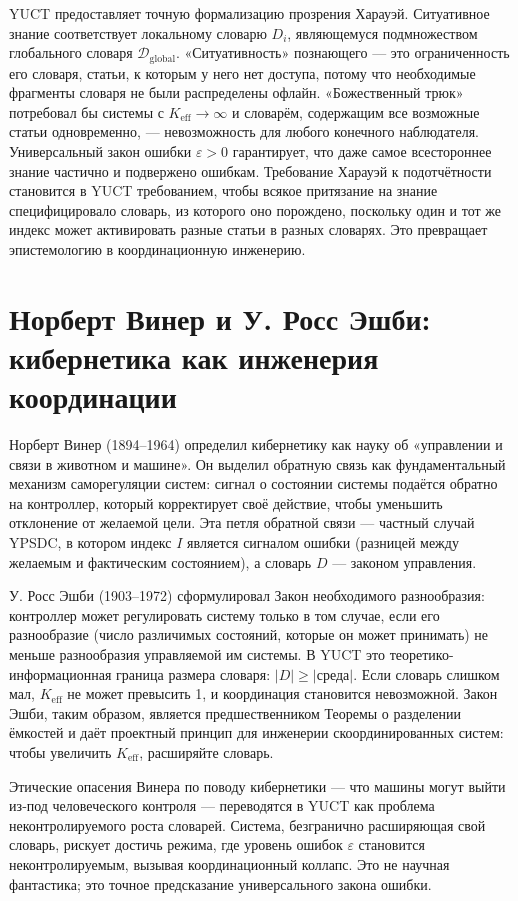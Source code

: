 \documentclass[12pt,a4paper]{article}
\begin{document}
	YUCT предоставляет точную формализацию прозрения Харауэй. Ситуативное знание соответствует локальному словарю \(D_i\), являющемуся подмножеством глобального словаря \(\mathcal{D}_{\text{global}}\). «Ситуативность» познающего — это ограниченность его словаря, статьи, к которым у него нет доступа, потому что необходимые фрагменты словаря не были распределены офлайн. «Божественный трюк» потребовал бы системы с \(K_{\mathrm{eff}} \to \infty\) и словарём, содержащим все возможные статьи одновременно, — невозможность для любого конечного наблюдателя. Универсальный закон ошибки \(\varepsilon > 0\) гарантирует, что даже самое всестороннее знание частично и подвержено ошибкам. Требование Харауэй к подотчётности становится в YUCT требованием, чтобы всякое притязание на знание специфицировало словарь, из которого оно порождено, поскольку один и тот же индекс может активировать разные статьи в разных словарях. Это превращает эпистемологию в координационную инженерию.
	
	\section{Норберт Винер и У. Росс Эшби: кибернетика как инженерия координации}
	
	Норберт Винер (1894–1964) определил кибернетику как науку об «управлении и связи в животном и машине». Он выделил обратную связь как фундаментальный механизм саморегуляции систем: сигнал о состоянии системы подаётся обратно на контроллер, который корректирует своё действие, чтобы уменьшить отклонение от желаемой цели. Эта петля обратной связи — частный случай YPSDC, в котором индекс \(I\) является сигналом ошибки (разницей между желаемым и фактическим состоянием), а словарь \(D\) — законом управления.
	
	У. Росс Эшби (1903–1972) сформулировал Закон необходимого разнообразия: контроллер может регулировать систему только в том случае, если его разнообразие (число различимых состояний, которые он может принимать) не меньше разнообразия управляемой им системы. В YUCT это теоретико-информационная граница размера словаря: \(|D| \ge |\text{среда}|\). Если словарь слишком мал, \(K_{\mathrm{eff}}\) не может превысить 1, и координация становится невозможной. Закон Эшби, таким образом, является предшественником Теоремы о разделении ёмкостей и даёт проектный принцип для инженерии скоординированных систем: чтобы увеличить \(K_{\mathrm{eff}}\), расширяйте словарь.
	
	Этические опасения Винера по поводу кибернетики — что машины могут выйти из‑под человеческого контроля — переводятся в YUCT как проблема неконтролируемого роста словарей. Система, безгранично расширяющая свой словарь, рискует достичь режима, где уровень ошибок \(\varepsilon\) становится неконтролируемым, вызывая координационный коллапс. Это не научная фантастика; это точное предсказание универсального закона ошибки.
	
\end{document}
